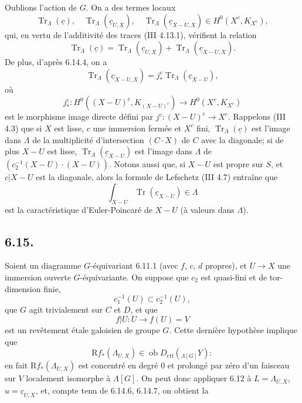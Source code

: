 \documentclass[11pt]{article}
\newcommand{\R}{\mathrm{R}}\newcommand{\RHomCore}{\mathrm{RHom}}
\providecommand{\Tr}{\operatorname{Tr}}
\providecommand{\Tr}{\operatorname{Tr}}
\providecommand{\Ob}{\operatorname{ob}}
\providecommand{\Tr}{\operatorname{Tr}}
\providecommand{\Ob}{\operatorname{ob}}
\providecommand{\R}{\mathrm R}
\providecommand{\Tr}{\operatorname{Tr}}
\providecommand{\Ob}{\operatorname{Ob}}
\providecommand{\Tr}{\operatorname{Tr}}
\providecommand{\Ob}{\operatorname{ob}}
\providecommand{\Ob}{\operatorname{Ob}}
\begin{document}
Oublions l'action de $G$. On a des termes locaux
\begin{equation}
\Tr_{\Lambda}(\underline c),\quad
\Tr_{\Lambda}(\underline c_{U,X}),\quad
\Tr_{\Lambda}(\underline c_{X-U,X})
\in H^0(X^c,K_{X^c}),
\tag{6.14.5}
\end{equation}
qui, en vertu de l'additivité des traces (III 4.13.1), vérifient la relation
\begin{equation}
\Tr_{\Lambda}(\underline c)
=
\Tr_{\Lambda}(\underline c_{U,X})
+
\Tr_{\Lambda}(\underline c_{X-U,X}).
\tag{6.14.6}
\end{equation}
De plus, d'après 6.14.4, on a
\begin{equation}
\Tr_{\Lambda}(\underline c_{X-U,X})
=
j_*^c\Tr_{\Lambda}(\underline c_{X-U}),
\tag{6.14.7}
\end{equation}
où
\[
j_*^c:H^0((X-U)^c,K_{(X-U)^c})\longrightarrow H^0(X^c,K_{X^c})
\]
est le morphisme image directe défini par $j^c:(X-U)^c\to X^c$. Rappelons (III 4.3) que si $X$ est lisse, $c$ une immersion fermée et $X^c$ fini, $\Tr_{\Lambda}(\underline c)$ est l'image dans $\Lambda$ de la multiplicité d'intersection $(C\cdot X)$ de $C$ avec la diagonale; si de plus $X-U$ est lisse, $\Tr_{\Lambda}(\underline c_{X-U})$ est l'image dans $\Lambda$ de $(c_2^{-1}(X-U)\cdot(X-U))$. Notons aussi que, si $X-U$ est propre sur $S$, et $c|X-U$ est la diagonale, alors la formule de
Lefschetz 
(III 4.7) entraîne que
\[
\int_{X-U}\Tr(\underline c_{X-U})\in\Lambda
\]
est la caractéristique d'Euler-Poincaré de $X-U$ (à valeurs dans $\Lambda$).

\subsection*{6.15.}
Soient un diagramme $G$-équivariant 6.11.1 (avec $f$, $c$, $d$ propres), et $U\to X$ une immersion ouverte $G$-équivariante. On suppose que $c_2$ est quasi-fini et de tor-dimension finie,
\[
c_1^{-1}(U)\subset c_2^{-1}(U),
\]
que $G$ agit trivialement sur $C$ et $D$, et que
\[
f|U:U\longrightarrow f(U)=V
\]
est un revêtement étale galoisien de groupe $G$. Cette dernière hypothèse implique que
\[
\R f_*(\Lambda_{U,X})\in\Ob D_{\mathrm{ctf}}({}_{\Lambda[G]}Y):
\]
en fait $\R f_*(\Lambda_{U,X})$ est concentré en degré $0$ et prolongé par zéro d'un faisceau sur $V$ localement isomorphe à $\Lambda[G]$. On peut donc appliquer 6.12 à $L=\Lambda_{U,X}$, $u=\underline c_{U,X}$, et, compte tenu de 6.14.6, 6.14.7, on obtient la
\end{document}
